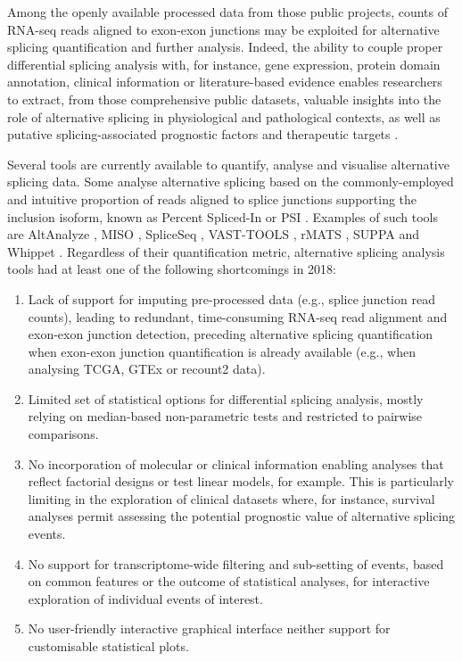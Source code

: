 Among the openly available processed data from those public projects, counts of RNA-seq reads aligned to exon-exon junctions may be exploited for alternative splicing quantification and further analysis. Indeed, the ability to couple proper differential splicing analysis with, for instance, gene expression, protein domain annotation, clinical information or literature-based evidence enables researchers to extract, from those comprehensive public datasets, valuable insights into the role of alternative splicing in physiological and pathological contexts, as well as putative splicing-associated prognostic factors and therapeutic targets \cite{tsai:2015ve,danan-gotthold:2015ut,chhibber:2017wm,climente-gonzalez:2017uj,anczukow:2015vl}.

Several tools are currently available to quantify, analyse and visualise alternative splicing data. Some analyse alternative splicing based on the commonly-employed and intuitive proportion of reads aligned to splice junctions supporting the inclusion isoform, known as Percent Spliced-In or PSI \cite{wang:2008wa}. Examples of such tools are AltAnalyze \cite{emig:2010ws}, MISO \cite{katz:2010tj}, SpliceSeq \cite{ryan:2012ts}, VAST-TOOLS \cite{irimia:2014wt}, rMATS \cite{shen:2014tk}, SUPPA \cite{alamancos:2015vc} and Whippet \cite{sterne-weiler:2018tk}. Regardless of their quantification metric, alternative splicing analysis tools had at least one of the following shortcomings in 2018:

\begin{enumerate}
	\item Lack of support for imputing pre-processed data (e.g., splice junction read counts), leading to redundant, time-consuming RNA-seq read alignment and exon-exon junction detection, preceding alternative splicing quantification when exon-exon junction quantification is already available (e.g., when analysing TCGA, GTEx or recount2 data).
	\item Limited set of statistical options for differential splicing analysis, mostly relying on median-based non-parametric tests and restricted to pairwise comparisons.
	\item No incorporation of molecular or clinical information enabling analyses that reflect factorial designs or test linear models, for example. This is particularly limiting in the exploration of clinical datasets where, for instance, survival analyses permit assessing the potential prognostic value of alternative splicing events.
	\item No support for transcriptome-wide filtering and sub-setting of events, based on common features or the outcome of statistical analyses, for interactive exploration of individual events of interest.
	\item No user-friendly interactive graphical interface neither support for customisable statistical plots.
\end{enumerate}

